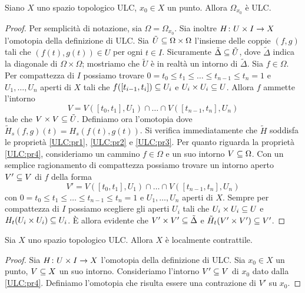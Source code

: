 \begin{proposition}
Siano $X$ uno spazio topologico ULC, $x_0\in X$ un punto. Allora $\Omega_{x_0}$ è ULC.
\end{proposition}
\begin{proof}
Per semplicità di notazione, sia $\Omega=\Omega_{x_0}$. Sia inoltre $H\colon U\times I\to X$ l'omotopia della definizione di ULC. Sia $\tilde{U}\subseteq\Omega\times\Omega$ l'insieme delle coppie $(f,g)$ tali che $(f(t),g(t))\in U$ per ogni $t\in I$. Sicuramente $\tilde\Delta\subseteq\tilde U$, dove $\tilde\Delta$ indica la diagonale di $\Omega\times\Omega$; mostriamo che $\tilde U$ è in realtà un intorno di $\tilde\Delta$. Sia $f\in\Omega$. Per compattezza di $I$ possiamo trovare $0=t_0\le t_1\le\ldots\le t_{n-1}\le t_n=1$ e $U_1,\ldots,U_n$ aperti di $X$ tali che $f([t_{i-1},t_i])\subseteq U_i$ e $U_i\times U_i\subseteq U$. Allora $f$ ammette l'intorno
$$
V=V([t_0,t_1],U_1)\cap\ldots\cap V([t_{n-1},t_n],U_n)
$$
tale che $V\times V\subseteq\tilde{U}$. Definiamo ora l'omotopia
dove $\tilde{H}_s(f,g)(t)=H_s(f(t),g(t))$. Si verifica immediatamente che $\tilde{H}$ soddisfa le proprietà \ref{ULC:pr1}, \ref{ULC:pr2} e \ref{ULC:pr3}. Per quanto riguarda la proprietà \ref{ULC:pr4}, consideriamo un cammino $f\in\Omega$ e un suo intorno $V\subseteq\Omega$. Con un semplice ragionamento di compattezza possiamo trovare un intorno aperto $V'\subseteq V$ di $f$ della forma
$$
V'=V([t_0,t_1],U_1)\cap\ldots\cap V([t_{n-1},t_n],U_n)
$$
con $0=t_0\le t_1\le\ldots\le t_{n-1}\le t_n=1$ e $U_1,\ldots,U_n$ aperti di $X$. Sempre per compattezza di $I$ possiamo scegliere gli aperti $U_i$ tali che $U_i\times U_i\subseteq U$ e $H_t(U_i\times U_i)\subseteq U_i$. È allora evidente che $V'\times V'\subseteq\tilde\Delta$ e $\tilde{H}_t(V'\times V')\subseteq V'$.
\end{proof}

\begin{proposition}
Sia $X$ uno spazio topologico ULC. Allora $X$ è localmente contrattile.
\end{proposition}
\begin{proof}
Sia $H\colon U\times I\to X$ l'omotopia della definizione di ULC. Sia $x_0\in X$ un punto, $V\subseteq X$ un suo intorno. Consideriamo l'intorno $V'\subseteq V$ di $x_0$ dato dalla \ref{ULC:pr4}. Definiamo l'omotopia
che risulta essere una contrazione di $V'$ su $x_0$.
\end{proof}

